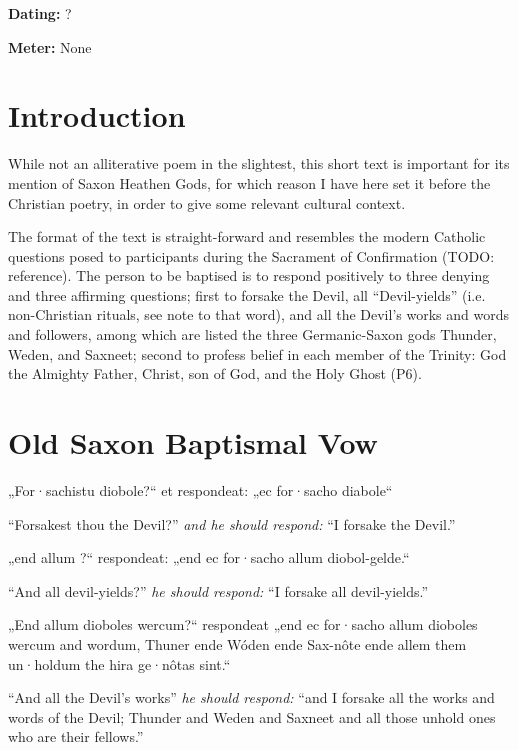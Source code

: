 
\begin{flushright}%
\textbf{Dating:} ?

\textbf{Meter:} None
\end{flushright}%

\section{Introduction}
While not an alliterative poem in the slightest, this short text is important for its mention of Saxon Heathen Gods, for which reason I have here set it before the Christian poetry, in order to give some relevant cultural context.

The format of the text is straight-forward and resembles the modern Catholic questions posed to participants during the Sacrament of Confirmation (TODO: reference).  The person to be baptised is to respond positively to three denying and three affirming questions; first to forsake the Devil, all “Devil-yields” (i.e. non-Christian rituals, see note to that word), and all the Devil’s works and words and followers, among which are listed the three Germanic-Saxon gods Thunder, Weden, and Saxneet; second to profess belief in each member of the Trinity: God the Almighty Father, Christ, son of God, and the Holy Ghost (P6).

\sectionline

\section{Old Saxon Baptismal Vow}

\bpg\bpa[0]%
„For·sachistu diobole?“ et respondeat: „ec for·sacho diabole“\epa

\bpb “Forsakest thou the Devil?” \emph{and he should respond:} “I forsake the Devil.”\epb\epg


\bpg\bpa[0][2]%
„end allum ?“ respondeat: „end ec for·sacho allum diobol-gelde.“\epa

\bpb “And all devil-yields?” \emph{he should respond:} “I forsake all devil-yields.”\epb\epg


\bpg\bpa[0][4]%
„End allum dioboles wercum?“ respondeat „end ec for·sacho allum dioboles wercum and wordum, Thuner ende Wóden ende Sax-nôte ende allem them un·holdum the hira ge·nôtas sint.“\epa

\bpb “And all the Devil’s works” \emph{he should respond:} “and I forsake all the works and words of the Devil; Thunder and Weden and Saxneet and all those unhold ones who are their fellows.”\epb\epg


